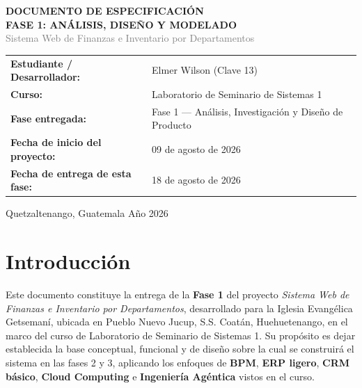 \documentclass[11pt,a4paper]{article}
\begin{document}
	\shorthandoff{><}
	
	\begin{titlepage}
		\centering
		\vspace*{1cm}
		
		{\Huge \bfseries \textcolor{primary}{DOCUMENTO DE ESPECIFICACIÓN}}\\[0.4cm]
		{\Large \bfseries \textcolor{darkbg}{FASE 1: ANÁLISIS, DISEÑO Y MODELADO}}\\[0.2cm]
		{\large \textcolor{gray}{Sistema Web de Finanzas e Inventario por Departamentos}}\\[1.5cm]
		
		
		
		\vfill
		
		\begin{table}[h!]
			\centering
			\renewcommand{\arraystretch}{1.4}
			\begin{tabular}{p{5cm} p{8cm}}
				\toprule
				\textbf{Estudiante / Desarrollador:} & Elmer Wilson (Clave 13)  \\
				\textbf{Curso:} & Laboratorio de Seminario de Sistemas 1 \\
				\textbf{Fase entregada:} & Fase 1 — Análisis, Investigación y Diseño de Producto \\
				\textbf{Fecha de inicio del proyecto:} & 09 de agosto de 2026 \\
				\textbf{Fecha de entrega de esta fase:} & 18 de agosto de 2026 \\
				\bottomrule
			\end{tabular}
		\end{table}
		
		\vfill
		{\small Quetzaltenango, Guatemala \hfill Año 2026}
	\end{titlepage}
	
	\newpage
	\tableofcontents
	\newpage
	
	\section{Introducción}
	Este documento constituye la entrega de la \textbf{Fase 1} del proyecto \emph{Sistema Web de Finanzas e Inventario por Departamentos}, desarrollado para la Iglesia Evangélica Getsemaní, ubicada en Pueblo Nuevo Jucup, S.S. Coatán, Huehuetenango, en el marco del curso de Laboratorio de Seminario de Sistemas 1. Su propósito es dejar establecida la base conceptual, funcional y de diseño sobre la cual se construirá el sistema en las fases 2 y 3, aplicando los enfoques de \textbf{BPM}, \textbf{ERP ligero}, \textbf{CRM básico}, \textbf{Cloud Computing} e \textbf{Ingeniería Agéntica} vistos en el curso.
	
\end{document}
